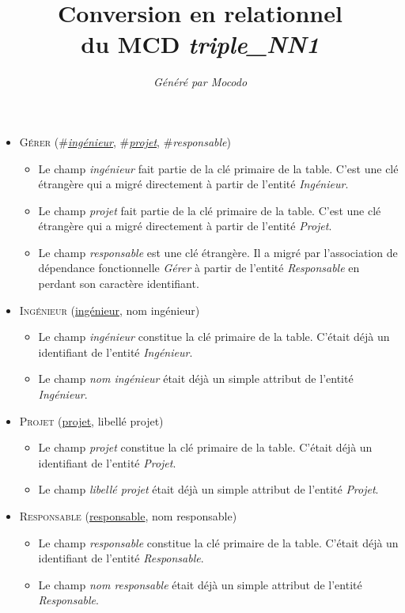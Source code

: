 \documentclass[a4paper]{article}
\title{Conversion en relationnel\\du MCD \emph{triple_NN1}}
\author{\emph{Généré par Mocodo}}
\newcommand{\relat}[1]{\textsc{#1}}
\newcommand{\attr}[1]{#1}
\newcommand{\prim}[1]{\uline{#1}}
\newcommand{\foreign}[1]{\#\textsl{#1}}
\begin{document}
\maketitle

\begin{itemize}
  \item \relat{Gérer} (\foreign{\prim{ingénieur}}, \foreign{\prim{projet}}, \foreign{responsable})
  \begin{itemize}
    \item Le champ \emph{ingénieur} fait partie de la clé primaire de la table. C'est une clé étrangère qui a migré directement à partir de l'entité \emph{Ingénieur}.
    \item Le champ \emph{projet} fait partie de la clé primaire de la table. C'est une clé étrangère qui a migré directement à partir de l'entité \emph{Projet}.
    \item Le champ \emph{responsable} est une clé étrangère. Il a migré par l'association de dépendance fonctionnelle \emph{Gérer} à partir de l'entité \emph{Responsable} en perdant son caractère identifiant.
  \end{itemize}

  \item \relat{Ingénieur} (\prim{ingénieur}, \attr{nom ingénieur})
  \begin{itemize}
    \item Le champ \emph{ingénieur} constitue la clé primaire de la table. C'était déjà un identifiant de l'entité \emph{Ingénieur}.
    \item Le champ \emph{nom ingénieur} était déjà un simple attribut de l'entité \emph{Ingénieur}.
  \end{itemize}

  \item \relat{Projet} (\prim{projet}, \attr{libellé projet})
  \begin{itemize}
    \item Le champ \emph{projet} constitue la clé primaire de la table. C'était déjà un identifiant de l'entité \emph{Projet}.
    \item Le champ \emph{libellé projet} était déjà un simple attribut de l'entité \emph{Projet}.
  \end{itemize}

  \item \relat{Responsable} (\prim{responsable}, \attr{nom responsable})
  \begin{itemize}
    \item Le champ \emph{responsable} constitue la clé primaire de la table. C'était déjà un identifiant de l'entité \emph{Responsable}.
    \item Le champ \emph{nom responsable} était déjà un simple attribut de l'entité \emph{Responsable}.
  \end{itemize}

\end{itemize}
\end{document}
